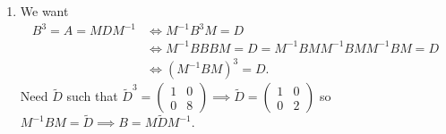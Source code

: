 \documentclass[10pt, a4paper]{article}
\begin{document}
\begin{problem}
\begin{solution}
\begin{enumerate}[label = (\alph*)]
            \item We want
            \begin{align*}
                B ^ 3 = A = MDM ^ {-1} &\iff M ^ {-1}B ^ 3M = D \\
                &\iff M ^ {-1}BBBM = D = M ^ {-1}BMM ^ {-1}BMM ^ {-1}BM = D \\
                &\iff (M ^ {-1}BM) ^ 3 = D.
            \end{align*}
            Need $\tilde{D}$ such that $\tilde{D} ^ 3 = \begin{pmatrix}
                1 & 0 \\ 0 & 8
            \end{pmatrix} \implies \tilde{D} = \begin{pmatrix}
                1 & 0 \\ 0 & 2
            \end{pmatrix}$
            so $M ^ {-1}BM = \tilde{D} \implies B = M\tilde{D}M ^ {-1}$.
        \end{enumerate}
    \end{solution}
\end{problem}
\end{document}
